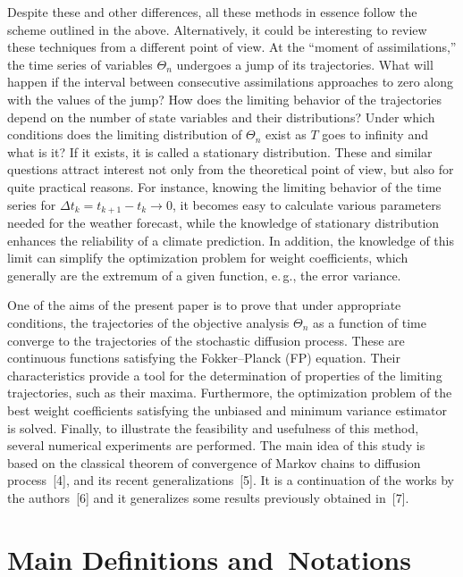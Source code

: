 \begin{multicols}{2}
Despite these and other differences, all these methods in essence follow the scheme outlined in the
above. Alternatively, it could be interesting to review these techniques 
from a different point of view. At the ``moment of assimilations,'' the time series 
of variables $\Theta_{n}$ undergoes a jump of its trajectories. What will happen if 
the interval between consecutive assimilations approaches to zero along with the values 
of the jump? How does the limiting behavior of the trajectories depend on the number of 
state variables and their distributions? Under which conditions does the limiting 
distribution of $\Theta_{n}$ exist as $ T $ goes to infinity and what is it? If 
it exists, it is called a stationary distribution. These and similar questions 
attract interest not  only from the theoretical point of view, but also for quite practical 
reasons. For instance, knowing the limiting behavior of the time series for 
$\Delta t_k =  t_{k+1}-t_{k}\rightarrow 0$, it becomes easy to calculate 
various parameters needed for the weather forecast, while the knowledge of stationary 
distribution enhances the reliability of a climate prediction. In addition, 
the knowledge of this limit can simplify the optimization problem for weight 
coefficients, which generally are the extremum of a given function, e.\,g., the 
error variance.

One of the aims of the present paper is to prove that under appropriate conditions, the 
trajectories of the objective analysis $\Theta_{n}$ as a function of time converge to the 
trajectories of the stochastic diffusion process. These are continuous functions satisfying 
the Fokker--Planck (FP) equation. Their characteristics provide a tool for the determination of 
properties of the limiting trajectories, such as their maxima. Furthermore, the optimization 
problem of the best weight coefficients satisfying the unbiased and minimum variance estimator 
is solved. Finally, to  illustrate the feasibility and usefulness of this method, 
several numerical experiments are performed. The main idea of this study is based on the 
classical theorem of convergence of Markov chains to diffusion process~[4], and its recent 
generalizations~[5]. It is a continuation of the works by the authors~[6] and it generalizes 
some results previously obtained in~[7]. 


\section{Main Definitions and~Notations}


\end{multicols}
